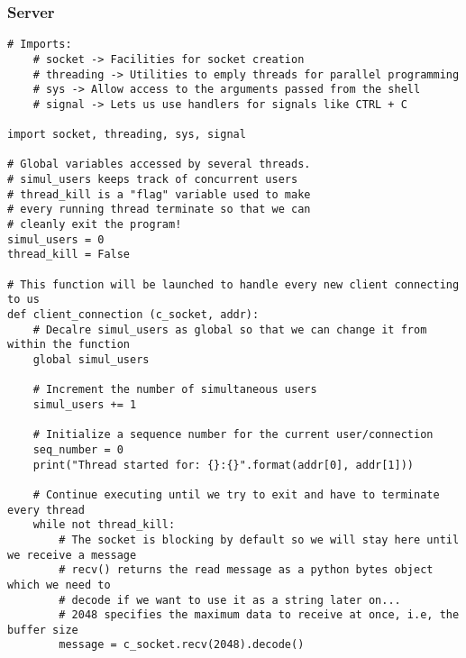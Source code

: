 \documentclass[landscape]{article}
\begin{document}
            \subsubsection{Server}
                \begin{verbatim}
# Imports:
    # socket -> Facilities for socket creation
    # threading -> Utilities to emply threads for parallel programming
    # sys -> Allow access to the arguments passed from the shell
    # signal -> Lets us use handlers for signals like CTRL + C

import socket, threading, sys, signal

# Global variables accessed by several threads.
# simul_users keeps track of concurrent users
# thread_kill is a "flag" variable used to make
# every running thread terminate so that we can
# cleanly exit the program!
simul_users = 0
thread_kill = False

# This function will be launched to handle every new client connecting to us
def client_connection (c_socket, addr):
    # Decalre simul_users as global so that we can change it from within the function
    global simul_users

    # Increment the number of simultaneous users
    simul_users += 1

    # Initialize a sequence number for the current user/connection
    seq_number = 0
    print("Thread started for: {}:{}".format(addr[0], addr[1]))

    # Continue executing until we try to exit and have to terminate every thread
    while not thread_kill:
        # The socket is blocking by default so we will stay here until we receive a message
        # recv() returns the read message as a python bytes object which we need to
        # decode if we want to use it as a string later on...
        # 2048 specifies the maximum data to receive at once, i.e, the buffer size
        message = c_socket.recv(2048).decode()


\end{verbatim}
\end{document}
